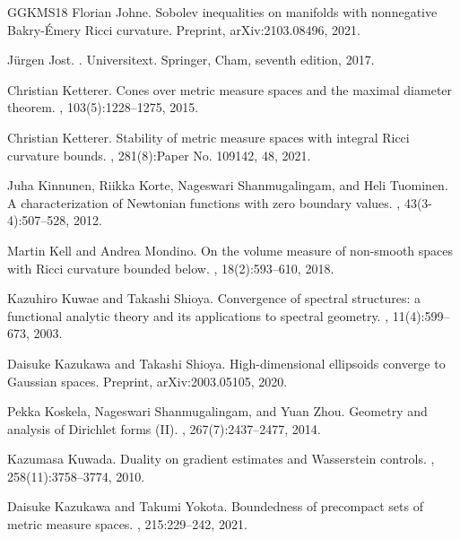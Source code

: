 \documentclass[11pt]{article}
\numberwithin{equation}{section}
\begin{document}
{\begin{thebibliography}{GGKMS18}
Florian Johne.
\newblock Sobolev inequalities on manifolds with nonnegative {B}akry-\'{E}mery
  {R}icci curvature.
\newblock Preprint, arXiv:2103.08496, 2021.

J\"{u}rgen Jost.
.
\newblock Universitext. Springer, Cham, seventh edition, 2017.

Christian Ketterer.
\newblock Cones over metric measure spaces and the maximal diameter theorem.
, 103(5):1228--1275, 2015.

Christian Ketterer.
\newblock Stability of metric measure spaces with integral {R}icci curvature
  bounds.
, 281(8):Paper No. 109142, 48, 2021.

Juha Kinnunen, Riikka Korte, Nageswari Shanmugalingam, and Heli Tuominen.
\newblock A characterization of {N}ewtonian functions with zero boundary
  values.
, 43(3-4):507--528,
  2012.

Martin Kell and Andrea Mondino.
\newblock On the volume measure of non-smooth spaces with {R}icci curvature
  bounded below.
, 18(2):593--610, 2018.

Kazuhiro Kuwae and Takashi Shioya.
\newblock Convergence of spectral structures: a functional analytic theory and
  its applications to spectral geometry.
, 11(4):599--673, 2003.

Daisuke Kazukawa and Takashi Shioya.
\newblock High-dimensional ellipsoids converge to {G}aussian spaces.
\newblock Preprint, arXiv:2003.05105, 2020.

Pekka Koskela, Nageswari Shanmugalingam, and Yuan Zhou.
\newblock Geometry and analysis of {D}irichlet forms ({II}).
, 267(7):2437--2477, 2014.

Kazumasa Kuwada.
\newblock Duality on gradient estimates and {W}asserstein controls.
, 258(11):3758--3774, 2010.

Daisuke Kazukawa and Takumi Yokota.
\newblock Boundedness of precompact sets of metric measure spaces.
, 215:229--242, 2021.


\end{thebibliography}}
\end{document}
